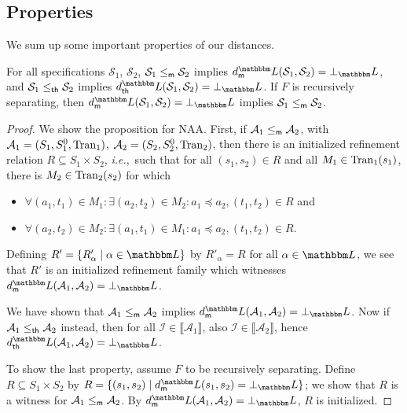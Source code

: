 \documentclass[twocolumn]{svjour3-dummy}
\newcommand*\labpre{\preccurlyeq}
\newcommand*\ie{\textit{i.e.},}
\newcommand*\cI{\mathcal I}
\newcommand*\NAA{NAA\xspace}
\newcommand*\mr{\le_\textup{\textsf{m}}}
\newcommand*\tr{\le_\textup{\textsf{th}}}
\newcommand*\cA{\mathcal A}
\newcommand*\Tran{\textup{\textrm{Tran}}}
\newcommand*\sem[1]{\llbracket #1\rrbracket}
\newcommand*\cS{\mathcal S}
\newcommand*\LL{\mathbbm L}
\begin{document}
\subsection{Properties}

We sum up some important properties of our distances.

\begin{proposition}
  \label{pr:dist-prop}
  For all specifications $\cS_1$, $\cS_2$, $\cS_1\mr \cS_2$ implies
  $\mdl( \cS_1, \cS_2)= \bot_\LL$, and $\cS_1\tr \cS_2$ implies $\thdl(
  \cS_1, \cS_2)= \bot_\LL$.  If $F$ is recursively separating, then
  $\mdl( \cS_1, \cS_2)= \bot_\LL$ implies $\cS_1\mr \cS_2$.
\end{proposition}

\begin{proof}We show the proposition for \NAA.  First, if $\cA_1\mr \cA_2$, with
  $\cA_1=( S_1, S_1^0, \Tran_1)$, $\cA_2=( S_2, S_2^0, \Tran_2)$, then
  there is an initialized refinement relation $R\subseteq S_1\times
  S_2$, \ie~such that for all $( s_1, s_2)\in R$ and all $M_1\in
  \Tran_1( s_1)$, there is $M_2\in \Tran_2( s_2)$ for which
  \begin{itemize}
  \item $\forall( a_1, t_1)\in M_1: \exists( a_2, t_2)\in M_2:
    a_1\labpre a_2,( t_1, t_2)\in R$ and
  \item $\forall( a_2, t_2)\in M_2: \exists( a_1, t_1)\in M_1:
    a_1\labpre a_2,( t_1, t_2)\in R$.
  \end{itemize}
  Defining $R'=\{ R'_\alpha\mid \alpha\in \LL\}$ by $R'_\alpha= R$ for
  all $\alpha\in \LL$, we see that $R'$ is an initialized refinement
  family which witnesses $\mdl( \cA_1, \cA_2)= \bot_\LL$.

  We have shown that $\cA_1\mr \cA_2$ implies $\mdl( \cA_1, \cA_2)=
  \bot_\LL$.  Now if $\cA_1\tr \cA_2$ instead, then for all
  $\cI\in \sem{ \cA_1}$, also $\cI\in \sem{ \cA_2}$, hence $\thdl( \cA_1,
  \cA_2)= \bot_\LL$.

  To show the last property, assume $F$ to be recursively separating.
  Define $R\subseteq S_1\times S_2$ by $R=\{( s_1, s_2)\mid \mdl( s_1,
  s_2)= \bot_\LL\}$; we show that $R$ is a witness for $\cA_1\mr
  \cA_2$.  By $\mdl( \cA_1, \cA_2)= \bot_\LL$, $R$ is initialized.


\end{proof}
\end{document}
